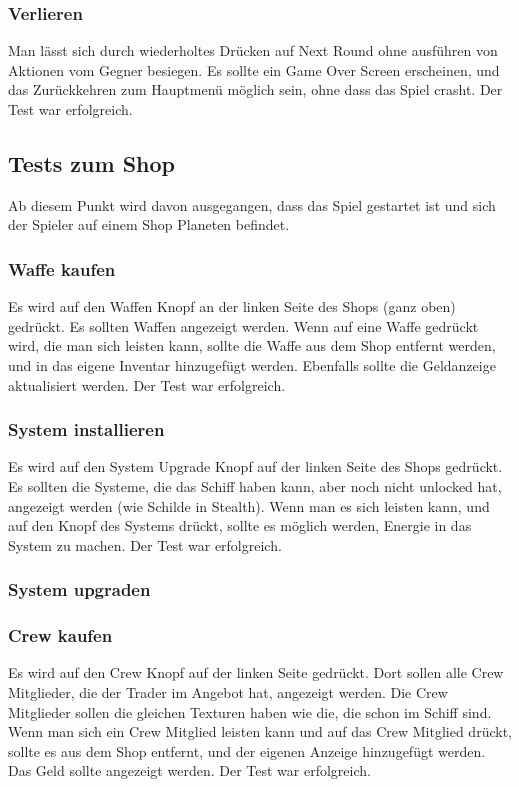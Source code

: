 \documentclass[fontsize=12pt,paper=a4,twoside]{scrartcl}
\begin{document}
\subsubsection{Verlieren}
Man lässt sich durch wiederholtes Drücken auf Next Round ohne ausführen von Aktionen vom Gegner besiegen. Es sollte ein Game Over Screen erscheinen, und das Zurückkehren zum Hauptmenü möglich sein, ohne dass das Spiel crasht.  Der Test war erfolgreich. \\
\subsection{Tests zum Shop}
Ab diesem Punkt wird davon ausgegangen, dass das Spiel gestartet ist und sich der Spieler auf einem Shop Planeten befindet. \\
\subsubsection{Waffe kaufen}
Es wird auf den Waffen Knopf an der linken Seite des Shops (ganz oben) gedrückt. Es sollten Waffen angezeigt werden. Wenn auf eine Waffe gedrückt wird, die man sich leisten kann, sollte die Waffe aus dem Shop entfernt werden, und in das eigene Inventar hinzugefügt werden. Ebenfalls sollte die Geldanzeige aktualisiert werden.  Der Test war erfolgreich. \\
\subsubsection{System installieren}
Es wird auf den System Upgrade Knopf auf der linken Seite des Shops gedrückt. Es sollten die Systeme, die das Schiff haben kann, aber noch nicht unlocked hat, angezeigt werden (wie Schilde in Stealth). Wenn man es sich leisten kann, und auf den Knopf des Systems drückt, sollte es möglich werden, Energie in das System zu machen.  Der Test war erfolgreich. \\ 
\subsubsection{System upgraden}
\subsubsection{Crew kaufen}
Es wird auf den Crew Knopf auf der linken Seite gedrückt. Dort sollen alle Crew Mitglieder, die der Trader im Angebot hat, angezeigt werden. Die Crew Mitglieder sollen die gleichen Texturen haben wie die, die schon im Schiff sind. Wenn man sich ein Crew Mitglied leisten kann und auf das Crew Mitglied drückt, sollte es aus dem Shop entfernt, und der eigenen Anzeige hinzugefügt werden. Das Geld sollte angezeigt werden.  Der Test war erfolgreich. \\
\end{document}
